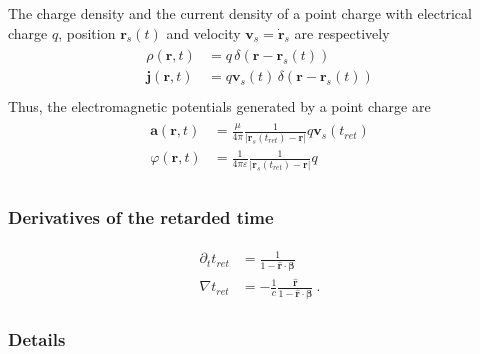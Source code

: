 \documentclass[letterpaper,10pt,english]{jupyterBook}
\begin{document}
\sphinxAtStartPar
{} The charge density and the current density of a point charge with electrical charge \(q\), position \(\mathbf{r}_s(t)\) and velocity \(\mathbf{v}_s = \dot{\mathbf{r}}_s\) are respectively
\begin{equation*}
\begin{split}\begin{aligned}
  \rho(\mathbf{r},t) & = q \, \delta ( \mathbf{r} - \mathbf{r}_s(t) ) \\
  \mathbf{j}(\mathbf{r},t) & = q \mathbf{v}_s(t) \, \delta ( \mathbf{r} - \mathbf{r}_s(t) ) \\
\end{aligned}\end{split}
\end{equation*}
\sphinxAtStartPar
Thus, the electromagnetic potentials generated by a point charge are
\begin{equation*}
\begin{split}\begin{aligned}
  \mathbf{a}(\mathbf{r},t) & = \frac{\mu}{4 \pi} \frac{1}{| \mathbf{r}_s(t_{ret}) - \mathbf{r} |} q \mathbf{v}_s(t_{ret}) \\
  \varphi(\mathbf{r},t) & = \frac{1}{4 \pi \varepsilon} \frac{1}{| \mathbf{r}_s(t_{ret}) - \mathbf{r} |} q  \\
\end{aligned}\end{split}
\end{equation*}\subsubsection*{Derivatives of the retarded time}
\begin{equation*}
\begin{split}\begin{aligned}
  \partial_t t_{ret} & = \frac{1}{1 - \hat{\mathbf{r}} \cdot \boldsymbol\beta} \\   
  \nabla     t_{ret} & = - \frac{1}{c} \frac{\hat{\mathbf{r}}}{1 - \hat{\mathbf{r}} \cdot \boldsymbol\beta}  \ .
\end{aligned}\end{split}
\end{equation*}\subsubsection*{Details}
\end{document}
